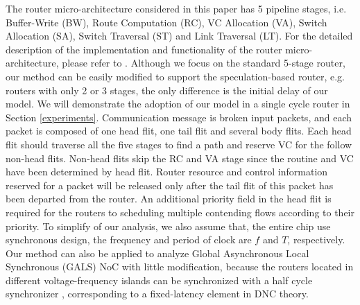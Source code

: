 \documentclass[10pt,journal]{IEEEtran}
\begin{document}
The router micro-architecture considered in this paper has 5 pipeline stages, i.e. Buffer-Write (BW), Route Computation (RC), VC Allocation (VA), Switch Allocation (SA), Switch Traversal (ST) and Link Traversal (LT). For the detailed description of the implementation and functionality of the router micro-architecture, please refer to \cite{jerger2009chip}. Although we focus on the standard 5-stage router, our method can be easily modified to support the speculation-based router, e.g. routers with only 2 or 3 stages, the only difference is the initial delay of our model. We will demonstrate the adoption of our model in a single cycle router in Section \ref{experiments}. Communication message is broken input packets, and each packet is composed of one head flit, one tail flit and several body flits. Each head flit should traverse all the five stages to find a path and reserve VC for the follow non-head flits. Non-head flits skip the RC and VA stage since the routine and VC have been determined by head flit. Router resource and control information reserved for a packet will be released only after the tail flit of this packet has been departed from the router. An additional priority field in the head flit is required for the routers to scheduling multiple contending flows according to their priority. To simplify of our analysis, we also assume that, the entire chip use synchronous design, the frequency and period of clock are $f$ and $T$, respectively. Our method can also be applied to analyze Global Asynchronous Local Synchronous (GALS) NoC with little modification, because the routers located in different voltage-frequency islands can be synchronized with a half cycle synchronizer \cite{5476986}, corresponding to a fixed-latency element in DNC theory.
\end{document}
